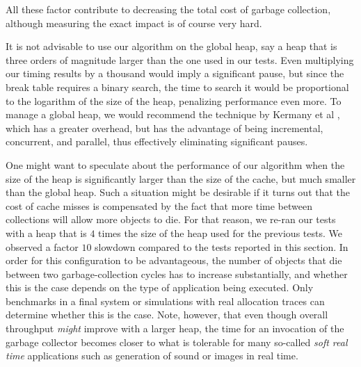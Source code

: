 All these factor contribute to decreasing the total cost of garbage
collection, although measuring the exact impact is of course very
hard. 

It is not advisable to use our algorithm on the global heap, say a
heap that is three orders of magnitude larger than the one used in
our tests.  Even multiplying our timing results by a thousand would
imply a significant pause, but since the break table requires a
binary search, the time to search it would be proportional to the
logarithm of the size of the heap, penalizing performance even more.
To manage a global heap, we would recommend the technique by 
Kermany et al \cite{Kermany:2006:CCI:1133981.1134023}, which has a
greater overhead, but has the advantage of being incremental,
concurrent, and parallel, thus effectively eliminating significant
pauses. 

One might want to speculate about the performance of our algorithm
when the size of the heap is significantly larger than the size of the
cache, but much smaller than the global heap.  Such a situation might
be desirable if it turns out that the cost of cache misses is
compensated by the fact that more time between collections will allow
more objects to die.  For that reason, we re-ran our tests with a heap
that is $4$ times the size of the heap used for the previous tests.  We
observed a factor $10$ slowdown compared to the tests reported in this
section.  In order for this configuration to be advantageous, the
number of objects that die between two garbage-collection cycles has
to increase substantially, and whether this is the case depends on the
type of application being executed.  Only benchmarks in a final system
or simulations with real allocation traces can determine whether this
is the case.  Note, however, that even though overall throughput
\emph{might} improve with a larger heap, the time for an invocation of
the garbage collector becomes closer to what is tolerable for many
so-called \emph{soft real time} applications such as generation of
sound or images in real time. 

